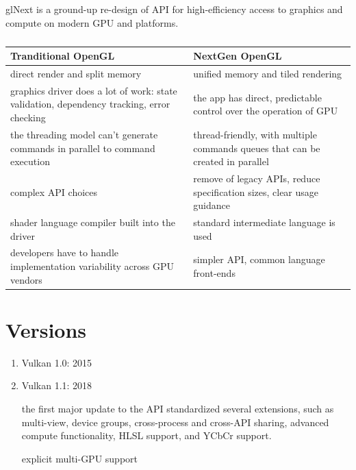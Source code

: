 glNext is a ground-up re-design of API for high-efficiency access to
graphics and compute on modern GPU and platforms.

\begin{table}[hbt]
\begin{center}
    \begin{tabular}{p{5cm}p{5cm}}
        \hline
        Tranditional OpenGL &  NextGen OpenGL \\
        \hline \hline
       direct render and split memory &  unified memory and tiled rendering \\
       graphics driver does a lot of work: state validation, dependency tracking, error checking
       & the app has direct, predictable control over the operation of GPU \\
       the threading model can't generate commands in parallel to command execution 
       & thread-friendly, with multiple commands queues that can be created in parallel \\
       complex API choices 
       & remove of legacy APIs, reduce specification sizes, clear usage guidance \\
       shader language compiler built into the driver 
       & standard intermediate language is used \\
       developers have to handle implementation variability across GPU vendors 
       & simpler API, common language front-ends 
        \hline
    \end{tabular}
\end{center}
\caption{}
\label{tab:glNext-comparison}
\end{table}

\section{Versions}

\begin{enumerate}
  \item Vulkan 1.0: 2015
  
  \item Vulkan 1.1: 2018
  
  the first major update to the API standardized several extensions, such as
  multi-view, device groups, cross-process and cross-API sharing, advanced
  compute functionality, HLSL support, and YCbCr support.
  
  explicit multi-GPU support 
   
\end{enumerate}

